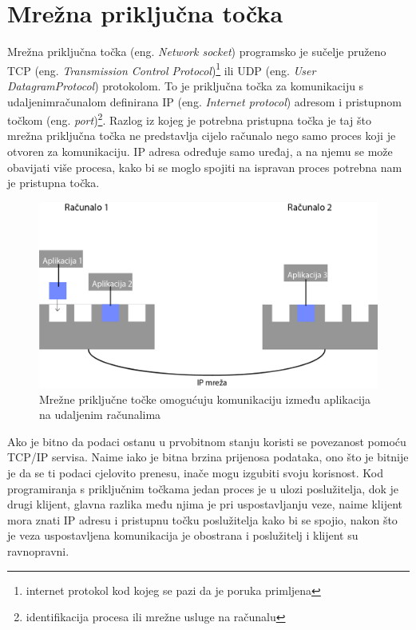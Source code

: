 \documentclass[times, utf8, zavrsni, square]{fer}
\begin{document}
\section{Mrežna priključna točka}
Mrežna priključna točka (eng. \textit{Network socket}) programsko je sučelje pruženo \linebreak
TCP (eng. \textit{Transmission Control Protocol})\footnote{internet protokol kod kojeg se pazi da je poruka primljena} 
ili UDP (eng. \textit{User Datagram\linebreak Protocol}) protokolom\cite{socket}.
To je priključna točka za komunikaciju s udaljenim\linebreak računalom definirana IP (eng. \textit{Internet protocol}) adresom i pristupnom točkom (eng. \textit{port})\footnote{identifikacija procesa ili mrežne usluge na računalu}.
Razlog iz kojeg je potrebna pristupna točka je taj što mrežna priključna točka ne predstavlja cijelo računalo nego samo proces koji je otvoren za komunikaciju. 
IP adresa određuje samo uređaj, a na njemu se može obavijati više procesa, 
kako bi se moglo spojiti na ispravan proces potrebna nam je pristupna točka\cite{socket2}.
\begin{figure}[h!]
    \centering
    \includegraphics[width=1\textwidth]{sockets}
    \caption{Mrežne priključne točke omogućuju komunikaciju između aplikacija na udaljenim računalima}
    \label{fig:sockets}
\end{figure} 
Ako je bitno da podaci ostanu u prvobitnom stanju koristi se povezanost pomoću TCP/IP servisa.
Naime iako je bitna brzina prijenosa podataka, ono što je bitnije je da se ti podaci cjelovito prenesu, inače mogu izgubiti svoju korisnost.
Kod programiranja s priključnim točkama jedan proces je u ulozi poslužitelja, dok je drugi klijent, glavna razlika među njima je pri uspostavljanju veze, naime klijent mora znati IP adresu i pristupnu točku poslužitelja kako bi se spojio, nakon što je veza uspostavljena komunikacija je obostrana i poslužitelj i klijent su ravnopravni.
\end{document}
